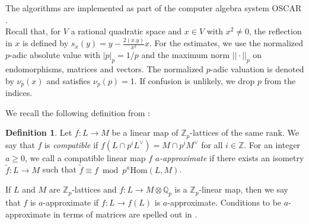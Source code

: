 \documentclass[11pt,letterpaper]{amsart}
\newcommand{\QQ}{\mathbb{Q}}
\newcommand{\ZZ}{\mathbb{Z}}
\theoremstyle{definition}
\newtheorem{definition}[theorem]{Definition}
\theoremstyle{remark}
\begin{document}
The algorithms are implemented as part of the computer algebra system OSCAR \cite{OSCAR}.\\


Recall that, for $V$ a rational quadratic space and $x \in V$ with $x^2 \neq 0$, the reflection in $x$ is defined by 
$s_x(y) = y- \frac{2(x.y)}{x^2} x$.
For the estimates, we use the normalized $p$-adic absolute value with $|p|_p=1/p$ and the maximum norm $|| \cdot ||_p$ on endomorphisms, matrices and vectors. The normalized $p$-adic valuation is denoted by $\nu_p(x)$ and satisfies $\nu_p(p)=1$.
If confusion is unlikely, we drop $p$ from the indices.

We recall the following definition from \cite[Section 4]{brandhorst.veniani.hensel-lifting}:
\begin{definition}
Let \(f\colon L \to M\) be a linear map of \(\ZZ_p\)-lattices of the same rank. 
We say that \(f\) is \emph{compatible} if \(f(L \cap p^iL^\vee)=M \cap p^iM^\vee\) for all \(i \in \ZZ\).
For an integer \(a \geq 0\), we call a compatible linear map \(f\) \emph{\(a\)-approximate} if there exists an isometry \(\tilde f \colon L \to M\) such that \(\tilde f \equiv f \bmod p^a\mathrm{Hom}(L,M)\). 
\end{definition}
If $L$ and $M$ are \(\ZZ_p\)-lattices and 
$f\colon L \to M\otimes \QQ_p$ is a $\ZZ_p$-linear map, then we say that $f$ is $a$-approximate if $f\colon L \to f(L)$ is $a$-approximate. Conditions to be $a$-approximate in terms of matrices are spelled out in \cite[Definition 4.2]{brandhorst.veniani.hensel-lifting}.
\end{document}
